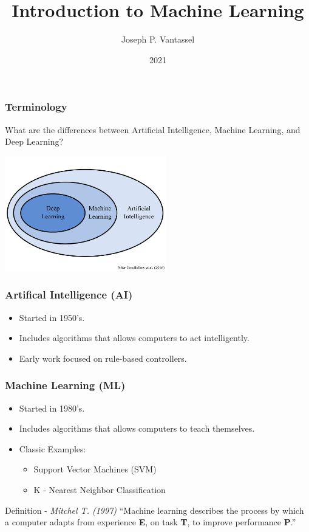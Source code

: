 \documentclass{beamer}
\title{Introduction to Machine Learning}
\author{Joseph P. Vantassel}
\institute{The University of Texas at Austin}
\date{2021}
\begin{document}
\frame{\titlepage}


\begin{frame}

\frametitle{Terminology}

What are the differences between Artificial Intelligence, Machine Learning, and Deep Learning?

\begin{center}
\includegraphics[height=5cm]{figs/0-ai_ml_dl_diagram.png}
\end{center}

\end{frame}


\begin{frame}

\frametitle{Artifical Intelligence (AI)}

\begin{itemize}
    \item Started in 1950's.
    \item Includes algorithms that allows computers to act intelligently.
    \item Early work focused on rule-based controllers.
\end{itemize}

\end{frame}


\begin{frame}

\frametitle{Machine Learning (ML)}

\begin{itemize}
    \item Started in 1980's.
    \item Includes algorithms that allows computers to teach themselves.
    \item Classic Examples:
    \begin{itemize}
        \item Support Vector Machines (SVM)
        \item K - Nearest Neighbor Classification
    \end{itemize}
\end{itemize}

\begin{block}{Definition - \textit{Mitchel T. (1997)}}
    ``Machine learning describes the process by which a computer adapts
    from experience \textbf{E}, on task \textbf{T}, to improve
    performance \textbf{P}.''
\end{block}

\end{frame}
\end{document}
